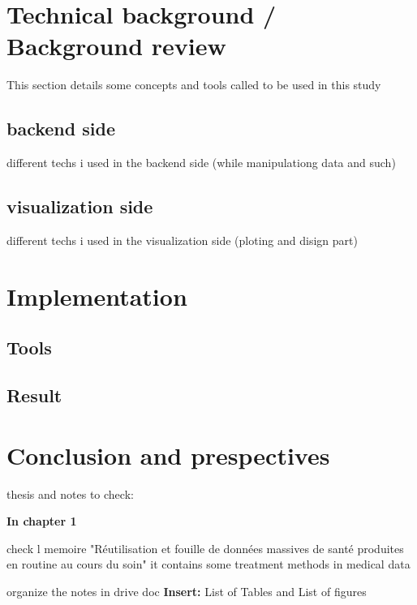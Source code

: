 
\chapter{Technical background / Background review}
This section details some concepts and tools called to be used in this study
\section{backend side}
different techs i used in the backend side (while manipulationg data and such)
\section{visualization side}
different techs i used in the visualization side (ploting and disign part)

\chapter{Implementation}
\section{Tools}
\section{Result}

\chapter{Conclusion and prespectives}

\newpage
thesis and notes to check:



\textbf{In chapter 1}

check l memoire "Réutilisation et fouille de données massives de santé produites en routine au cours du soin" it contains some treatment methods in medical data 

\bigbreak
organize the notes in drive doc
\bigbreak
\textbf{Insert:} 
 List of Tables   and 	List of figures